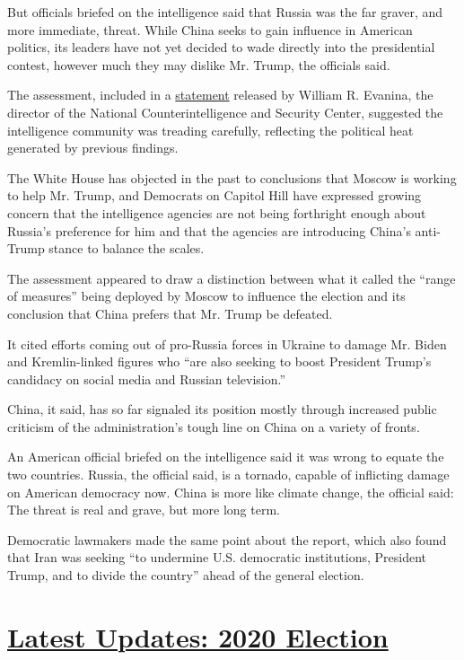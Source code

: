 But officials briefed on the intelligence said that Russia was the far
graver, and more immediate, threat. While China seeks to gain influence
in American politics, its leaders have not yet decided to wade directly
into the presidential contest, however much they may dislike Mr. Trump,
the officials said.

The assessment, included in a
\href{https://www.dni.gov/index.php/newsroom/press-releases/item/2139-statement-by-ncsc-director-william-evanina-election-threat-update-for-the-american-public}{statement}
released by William R. Evanina, the director of the National
Counterintelligence and Security Center, suggested the intelligence
community was treading carefully, reflecting the political heat
generated by previous findings.

The White House has objected in the past to conclusions that Moscow is
working to help Mr. Trump, and Democrats on Capitol Hill have expressed
growing concern that the intelligence agencies are not being forthright
enough about Russia's preference for him and that the agencies are
introducing China's anti-Trump stance to balance the scales.

The assessment appeared to draw a distinction between what it called the
``range of measures'' being deployed by Moscow to influence the election
and its conclusion that China prefers that Mr. Trump be defeated.

It cited efforts coming out of pro-Russia forces in Ukraine to damage
Mr. Biden and Kremlin-linked figures who ``are also seeking to boost
President Trump's candidacy on social media and Russian television.''

China, it said, has so far signaled its position mostly through
increased public criticism of the administration's tough line on China
on a variety of fronts.

An American official briefed on the intelligence said it was wrong to
equate the two countries. Russia, the official said, is a tornado,
capable of inflicting damage on American democracy now. China is more
like climate change, the official said: The threat is real and grave,
but more long term.

Democratic lawmakers made the same point about the report, which also
found that Iran was seeking ``to undermine U.S. democratic institutions,
President Trump, and to divide the country'' ahead of the general
election.

\hypertarget{latest-updates-2020-election}{%
\section{\texorpdfstring{\href{https://www.nytimes3xbfgragh.onion/2020/08/07/us/elections/trump-biden.html?action=click\&pgtype=Article\&state=default\&region=MAIN_CONTENT_1\&context=storylines_live_updates}{Latest
Updates: 2020
Election}}{Latest Updates: 2020 Election}}\label{latest-updates-2020-election}}

